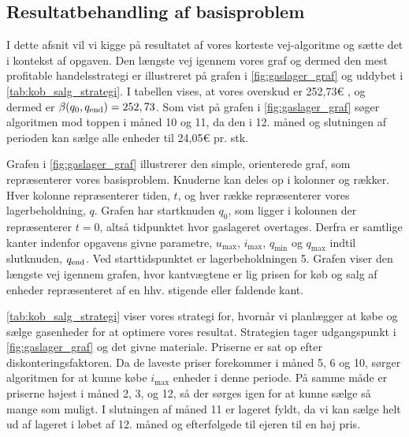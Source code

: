 \subsection{Resultatbehandling af basisproblem}

I dette afsnit vil vi kigge på resultatet af vores korteste vej-algoritme og sætte det i kontekst af opgaven. Den længste vej igennem vores graf og dermed den mest profitable handelsstrategi er illustreret på grafen i \autoref{fig:gaslager_graf} og uddybet i \autoref{tab:kob_salg_strategi}. I tabellen vises, at vores overskud er 252,73€ %
, og dermed er $\beta (q_0, q_{\textrm{end}}) = 252,73$. Som vist på grafen i \autoref{fig:gaslager_graf} søger algoritmen mod toppen i måned 10 og 11, da den i 12. måned og slutningen af perioden kan sælge alle enheder til 24,05€ pr. stk. 



Grafen i \autoref{fig:gaslager_graf} illustrerer den simple, orienterede graf, som repræsenterer vores basisproblem. Knuderne kan deles op i kolonner og rækker. Hver kolonne repræsenterer tiden, $t$, og hver række repræsenterer vores lagerbeholdning, $q$. Grafen har startknuden $q_0$, som ligger i kolonnen der repræsenterer $t=0$, altså tidpunktet hvor gaslageret overtages. Derfra er samtlige kanter indenfor opgavens givne parametre, $u_{\max }$, $i_{\max }$, $q_{\min }$ og $q_{\max }$ indtil slutknuden, $q_{\textrm{end}}$. Ved starttidspunktet er lagerbeholdningen 5. Grafen viser den længste vej igennem grafen, hvor kantvægtene er lig prisen for køb og salg af enheder repræsenteret af en hhv. stigende eller faldende kant.



\autoref{tab:kob_salg_strategi} viser vores strategi for, hvornår vi planlægger at købe og sælge gasenheder for at optimere vores resultat. Strategien tager udgangspunkt i \autoref{fig:gaslager_graf} og det givne materiale. Priserne er sat op efter diskonteringsfaktoren.%
Da de laveste priser forekommer i måned 5, 6 og 10, sørger algoritmen for at kunne købe $i_{\max}$ enheder i denne periode. På samme måde er priserne højest i måned 2, 3, og 12, så der sørges igen for at kunne sælge så mange som muligt. I slutningen af måned 11 er lageret fyldt, da vi kan sælge helt ud af lageret i løbet af 12. måned og efterfølgede til ejeren til en høj pris.
